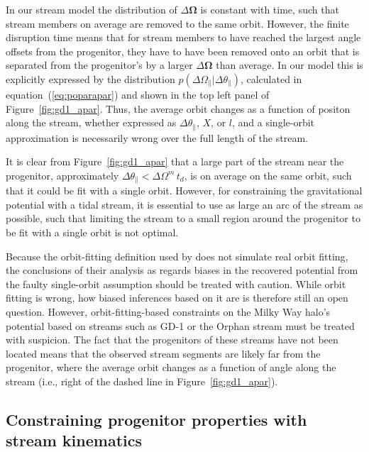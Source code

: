 \documentclass[12pt,preprint]{aastex}
\newcommand{\ie}{i.e.}
\newcommand{\eqnname}{equation}
\newcommand{\equationname}{\eqnname}
\renewcommand{\figurename}{Figure}
\renewcommand{\vec}[1]{\ensuremath{\mathbf{#1}}}
\newcommand{\veco}{\ensuremath{\vec{\Omega}}}
\newcommand{\apar}{\ensuremath{\theta_\parallel}}
\newcommand{\opar}{\ensuremath{\Omega_\parallel}}
\begin{document}
In our stream model the distribution of $\Delta \veco$ is constant
with time, such that stream members on average are removed to the same
orbit. However, the finite disruption time means that for stream
members to have reached the largest angle offsets from the progenitor,
they have to have been removed onto an orbit that is separated from
the progenitor's by a larger $\Delta \veco$ than average. In our model
this is explicitly expressed by the distribution $p(\Delta
\opar|\Delta \apar)$, calculated in \equationname~(\ref{eq:poparapar})
and shown in the top left panel of
\figurename~\ref{fig:gd1_apar}. Thus, the average orbit changes as a
function of positon along the stream, whether expressed as $\Delta
\apar$, $X$, or $l$, and a single-orbit approximation is necessarily
wrong over the full length of the stream.

It is clear from \figurename~\ref{fig:gd1_apar} that a large part of
the stream near the progenitor, approximately $\Delta \apar < \Delta
\Omega^m\,t_d$, is on average on the same orbit, such that it could be
fit with a single orbit. However, for constraining the gravitational
potential with a tidal stream, it is essential to use as large an arc
of the stream as possible, such that limiting the stream to a small
region around the progenitor to be fit with a single orbit is not
optimal.

Because the orbit-fitting definition used by \citet{Sanders13a} does
not simulate real orbit fitting, the conclusions of their analysis as
regards biases in the recovered potential from the faulty single-orbit
assumption should be treated with caution. While orbit fitting is
wrong, how biased inferences based on it are is therefore still an
open question. However, orbit-fitting-based constraints on the Milky
Way halo's potential based on streams such as GD-1 or the Orphan
stream must be treated with suspicion. The fact that the progenitors
of these streams have not been located means that the observed stream
segments are likely far from the progenitor, where the average orbit
changes as a function of angle along the stream (\ie, right of the
dashed line in \figurename~\ref{fig:gd1_apar}).


\subsection{Constraining progenitor properties with stream kinematics}



\end{document}

